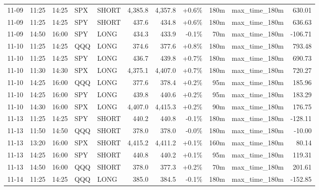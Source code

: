\documentclass[11pt,a4paper,twoside]{article}
\begin{document}
\begin{center}
\begin{longtable}{>{\color{txtmain}}l l l l l r r r r >{\color{txtmain}}l r}
11-09 & 11:25 & 14:25 & SPX & SHORT & 4,385.8 & 4,357.8 & \textcolor{wingreen}{+0.6\%} & 180m & max\_time\_180m & \textcolor{wingreen}{630.01} \\
11-09 & 11:25 & 14:25 & SPY & SHORT & 437.6 & 434.8 & \textcolor{wingreen}{+0.6\%} & 180m & max\_time\_180m & \textcolor{wingreen}{636.63} \\
11-09 & 14:50 & 16:00 & SPY & LONG & 434.3 & 433.9 & \textcolor{lossred}{-0.1\%} & 70m & max\_time\_180m & \textcolor{lossred}{-106.71} \\
11-10 & 11:25 & 14:25 & QQQ & LONG & 374.6 & 377.6 & \textcolor{wingreen}{+0.8\%} & 180m & max\_time\_180m & \textcolor{wingreen}{793.48} \\
11-10 & 11:25 & 14:25 & SPY & LONG & 436.7 & 439.8 & \textcolor{wingreen}{+0.7\%} & 180m & max\_time\_180m & \textcolor{wingreen}{690.73} \\
11-10 & 11:30 & 14:30 & SPX & LONG & 4,375.1 & 4,407.0 & \textcolor{wingreen}{+0.7\%} & 180m & max\_time\_180m & \textcolor{wingreen}{720.27} \\
11-10 & 14:25 & 16:00 & QQQ & LONG & 377.6 & 378.4 & \textcolor{wingreen}{+0.2\%} & 95m & max\_time\_180m & \textcolor{wingreen}{185.96} \\
11-10 & 14:25 & 16:00 & SPY & LONG & 439.8 & 440.6 & \textcolor{wingreen}{+0.2\%} & 95m & max\_time\_180m & \textcolor{wingreen}{183.29} \\
11-10 & 14:30 & 16:00 & SPX & LONG & 4,407.0 & 4,415.3 & \textcolor{wingreen}{+0.2\%} & 90m & max\_time\_180m & \textcolor{wingreen}{176.75} \\
11-13 & 11:25 & 14:25 & SPY & SHORT & 440.2 & 440.8 & \textcolor{lossred}{-0.1\%} & 180m & max\_time\_180m & \textcolor{lossred}{-128.11} \\
11-13 & 11:50 & 14:50 & QQQ & SHORT & 378.0 & 378.0 & \textcolor{wingreen}{-0.0\%} & 180m & max\_time\_180m & \textcolor{lossred}{-10.00} \\
11-13 & 13:20 & 16:00 & SPX & SHORT & 4,415.2 & 4,411.2 & \textcolor{wingreen}{+0.1\%} & 160m & max\_time\_180m & \textcolor{wingreen}{80.14} \\
11-13 & 14:25 & 16:00 & SPY & SHORT & 440.8 & 440.2 & \textcolor{wingreen}{+0.1\%} & 95m & max\_time\_180m & \textcolor{wingreen}{119.31} \\
11-13 & 14:50 & 16:00 & QQQ & SHORT & 378.0 & 377.3 & \textcolor{wingreen}{+0.2\%} & 70m & max\_time\_180m & \textcolor{wingreen}{201.61} \\
11-14 & 11:25 & 14:25 & QQQ & LONG & 385.0 & 384.5 & \textcolor{lossred}{-0.1\%} & 180m & max\_time\_180m & \textcolor{lossred}{-152.85} \\

\end{longtable}
\end{center}
\end{document}
